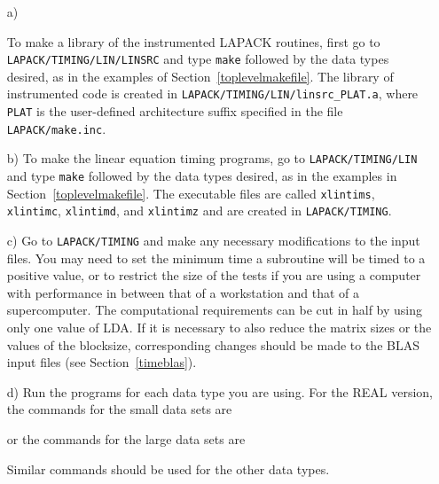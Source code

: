 \documentclass[11pt]{report}
\begin{document}
\begin{itemize}
\item[a)]
\begin{sloppypar}
To make a library of the instrumented LAPACK routines, first
go to \texttt{LAPACK/TIMING/LIN/LINSRC} and type \texttt{make} followed
by the data types desired, as in the examples of Section~\ref{toplevelmakefile}. 
The library of instrumented code is created in
\texttt{LAPACK/TIMING/LIN/linsrc\_PLAT.a},
where \texttt{PLAT} is the user-defined architecture suffix specified in the
file \texttt{LAPACK/make.inc}.
\end{sloppypar}

\item[b)]
To make the linear equation timing programs,
go to \texttt{LAPACK/TIMING/LIN} and type \texttt{make} followed by the data
types desired, as in the examples in Section~\ref{toplevelmakefile}.
The executable files are called \texttt{xlintims},
\texttt{xlintimc}, \texttt{xlintimd}, and \texttt{xlintimz} and are created
in \texttt{LAPACK/TIMING}.

\item[c)]
Go to \texttt{LAPACK/TIMING} and
make any necessary modifications to the input files.
You may need to set the minimum time a subroutine will
be timed to a positive value, or to restrict the size of the tests
if you are using a computer with performance in between that of a
workstation and that of a supercomputer.
The computational requirements can be cut in half by using only one
value of LDA.
If it is necessary to also reduce the matrix sizes or the values of
the blocksize, corresponding changes should be made to the 
BLAS input files (see Section~\ref{timeblas}).

\item[d)]
Run the programs for each data type you are using. 
For the REAL version, the commands for the small data sets are

or the commands for the large data sets are

\noindent
Similar commands should be used for the other data types.
\end{itemize}
\end{document}
